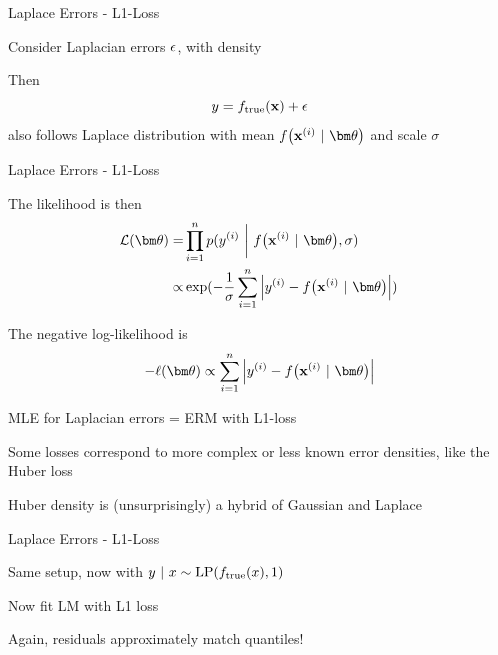 \documentclass[11pt,compress,t,notes=noshow, xcolor=table]{beamer}
\begin{document}
\begin{framei}[sep=M]{Laplace Errors - L1-Loss}

\item Consider Laplacian errors $\epsilon$, with density 

\vfill

\item Then
$$
y = f_{\text{true}}(\mathbf{x}) + \epsilon 
$$
also follows Laplace distribution with mean $\fxit$ and scale  $\sigma$ 

\end{framei}


\begin{framei}[sep=M]{Laplace Errors - L1-Loss}

\item The likelihood is then 
\begin{align*}
\LL(\thetav) =& \prod_{i=1}^n \pdf(\yi ~\bigg|~ \fxit, \sigma) \\ 
\propto& \exp(-\frac{1}{\sigma}\sumin \left|\yi - \fxit\right|)\,
\end{align*}
\item The negative log-likelihood is
$$
- \loglt \propto \sumin \left|\yi - \fxit\right|
$$
\item MLE for Laplacian errors = ERM with L1-loss 
\item Some losses correspond to more complex or less known error densities, like the Huber loss 
\item Huber density is (unsurprisingly) a hybrid of Gaussian and Laplace

\end{framei}
\begin{framei}[sep=M]{Laplace Errors - L1-Loss}

\item Same setup, now with $y ~|~x \sim \text{LP}(f_{\text{true}}(x), 1)$ 
\item Now fit LM with L1 loss

\vfill


\item Again, residuals approximately match quantiles!

\end{framei}
\end{document}
